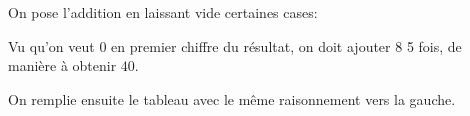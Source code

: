 \documentclass[fleqn,a4paper,nobib]{tufte-handout}
\begin{document}
\begin{solution}
    On pose l'addition en laissant vide certaines cases:

        
    Vu qu'on veut $0$ en premier chiffre du résultat, on doit
    ajouter
    $8$ 5 fois, de manière à obtenir $40$.



    On remplie ensuite le tableau avec le même raisonnement
    vers la gauche.

\end{solution}
\end{document}
